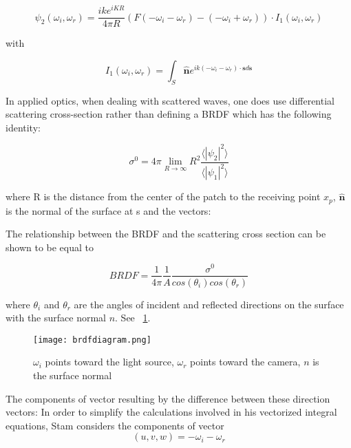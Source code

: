 \begin{equation}
\psi_{2}(\omega_i, \omega_r) = \frac{i k e^{i K R}}{4 \pi R} (F(-\omega_i-\omega_r)-(-\omega_i+\omega_r)) \cdot I_{1}(\omega_i, \omega_r) 
\label{eq:kirchhoff}
\end{equation}

with

\begin{equation}
I_{1}(\omega_i, \omega_r) = \int_{S} \hat{\mathbf{n}} e^{ik(-\omega_i-\omega_{r}) \cdot \mathbf{s} d\mathbf{s}}
\label{eq:IBase}
\end{equation}

In applied optics, when dealing with scattered waves, one does use differential scattering cross-section rather than defining a BRDF which has the following identity: 

\begin{equation}
    \sigma^0 = 4 \pi \lim_{R \to \infty} R^2 \frac{\langle \left|\psi_2\right|^2\rangle}{\langle \left|\psi_1\right|^2\rangle}
\end{equation}

where R is the distance from the center of the patch to the receiving point $x_p$, $\hat{\mathbf{n}}$ is the normal of the surface at s and the vectors:

The relationship between the BRDF and the scattering cross section can be shown to be equal to 

\begin{equation}
 BRDF = \frac{1}{4\pi}\frac{1}{A}\frac{\sigma^0}{cos(\theta_i)cos(\theta_r)}
 \label{fig:crossscateringbrdfrelationship} 
\end{equation}

where $\theta_i$ and $\theta_r$ are the angles of incident and reflected directions on the surface with the surface normal $n$. See ~\ref{fig:geometricsetup}.

\begin{figure}[ht]
  \centering
  \texttt{[image: brdfdiagram.png]}
  \caption{$\omega_i$ points toward the light source, $\omega_r$ points toward the camera, $n$ is the surface normal}
  \label{fig:geometricsetup}  
\end{figure}

The components of vector resulting by the difference between these direction vectors:
In order to simplify the calculations involved in his vectorized integral equations, Stam considers the components of vector 
\begin{equation}
  (u,v,w) = -\omega_i - \omega_r 
\label{eq:uvw}
\end{equation}

